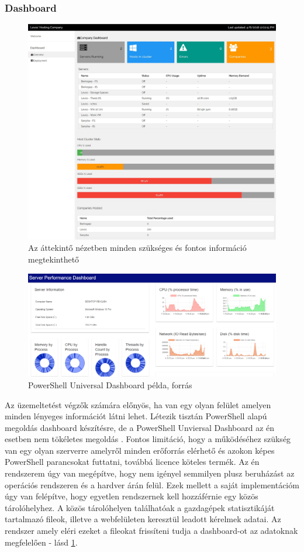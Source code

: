 \documentclass[12pt,oneside,justify,table]{book}
\begin{document}
\subsubsection{Dashboard}
\begin{figure}
\centering
\includegraphics[width=1\textwidth]{dashboard.jpg}
\caption{Az áttekintő nézetben minden szükséges és fontos információ megtekinthető}
\label{fig:owndash}
\end{figure}

\begin{figure}
\centering
\includegraphics[width=1\textwidth]{psudashboard.png}
\caption{PowerShell Universal Dashboard példa, forrás \cite{poshtools}}
\label{fig:psudash}
\end{figure}
Az üzemeltetést végzők számára előnyös, ha van egy olyan felület amelyen minden lényeges információt látni lehet. Létezik tisztán PowerShell alapú megoldás dashboard készítésre, de a PowerShell Unviersal Dashboard az én esetben nem tökéletes megoldás \cite{poshtools}. Fontos limitáció, hogy a működéséhez szükség van egy olyan szerverre amelyről minden erőforrás elérhető és azokon képes PowerShell parancsokat futtatni, továbbá licence köteles termék. Az én rendszerem úgy van megépítve, hogy nem igényel semmilyen plusz beruházást az operációs rendszeren és a hardver árán felül. Ezek mellett a saját implementációm úgy van felépítve, hogy egyetlen rendszernek kell hozzáférnie egy közös tárolóhelyhez. A közös tárolóhelyen találhatóak a gazdagépek statisztikáját tartalmazó fileok, illetve a webfelületen keresztül leadott kérelmek adatai. Az rendszer amely eléri ezeket a fileokat frissíteni tudja a dashboard-ot az adatoknak megfelelően - lásd \ref{fig:owndash}.
\end{document}
